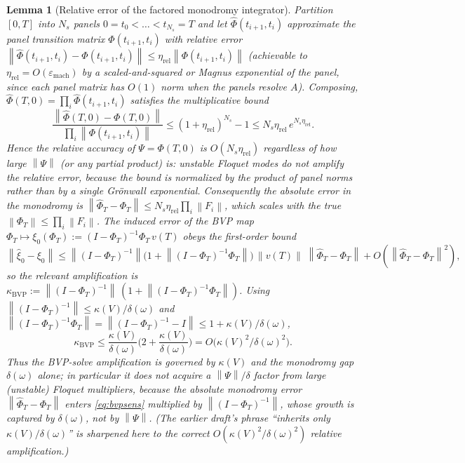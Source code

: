 \documentclass{amsart}
\newtheorem{lemma}{Lemma}
\theoremstyle{definition}
\newcommand{\norm}[1]{\left\lVert#1\right\rVert}
\begin{document}
\begin{lemma}[Relative error of the factored monodromy integrator]\label{lem:stiff}
Partition $[0,T]$ into $N_s$ panels $0=t_0<\dots<t_{N_s}=T$ and let
$\hat\Phi(t_{i+1},t_i)$ approximate the panel transition matrix
$\Phi(t_{i+1},t_i)$ with \emph{relative} error
$\norm{\hat\Phi(t_{i+1},t_i)-\Phi(t_{i+1},t_i)}\le\eta_{\mathrm{rel}}
\norm{\Phi(t_{i+1},t_i)}$ (achievable to $\eta_{\mathrm{rel}}=O(\varepsilon_{\mathrm{mach}})$
by a scaled-and-squared or Magnus exponential of the panel, since each panel
matrix has $O(1)$ norm when the panels resolve $A$). Composing,
$\hat\Phi(T,0)=\prod_i\hat\Phi(t_{i+1},t_i)$ satisfies the multiplicative bound
\begin{equation}\label{eq:stifferr}
\frac{\norm{\hat\Phi(T,0)-\Phi(T,0)}}{\prod_i\norm{\Phi(t_{i+1},t_i)}}
\le (1+\eta_{\mathrm{rel}})^{N_s}-1\le N_s\eta_{\mathrm{rel}}\,e^{N_s\eta_{\mathrm{rel}}}.
\end{equation}
Hence the \emph{relative} accuracy of $\Psi=\Phi(T,0)$ is $O(N_s\eta_{\mathrm{rel}})$
\emph{regardless of how large $\norm\Psi$ (or any partial product) is}: unstable
Floquet modes do not amplify the relative error, because the bound is normalized
by the product of panel norms rather than by a single Gr\"onwall exponential.
Consequently the absolute error in the monodromy is
$\norm{\hat\Phi_T-\Phi_T}\le N_s\eta_{\mathrm{rel}}\prod_i\norm{F_i}$, which
scales with the true $\norm{\Phi_T}\le\prod_i\norm{F_i}$. The induced error of
the BVP map $\Phi_T\mapsto\xi_0(\Phi_T):=(I-\Phi_T)^{-1}\Phi_T\,v(T)$ obeys the
first-order bound
\begin{equation}\label{eq:bvpsens}
\norm{\hat\xi_0-\xi_0}
\le \norm{(I-\Phi_T)^{-1}}\big(1+\norm{(I-\Phi_T)^{-1}\Phi_T}\big)\,
\norm{v(T)}\;\norm{\hat\Phi_T-\Phi_T}+O(\norm{\hat\Phi_T-\Phi_T}^2),
\end{equation}
so the relevant amplification is
$\kappa_{\mathrm{BVP}}:=\norm{(I-\Phi_T)^{-1}}\,(1+\norm{(I-\Phi_T)^{-1}\Phi_T})$.
Using $\norm{(I-\Phi_T)^{-1}}\le\kappa(V)/\delta(\omega)$ and
$\norm{(I-\Phi_T)^{-1}\Phi_T}=\norm{(I-\Phi_T)^{-1}-I}\le 1+\kappa(V)/\delta(\omega)$,
\begin{equation}\label{eq:kbvp}
\kappa_{\mathrm{BVP}}\le \frac{\kappa(V)}{\delta(\omega)}\Big(2+\frac{\kappa(V)}{\delta(\omega)}\Big)
= O\!\big(\kappa(V)^2/\delta(\omega)^2\big).
\end{equation}
Thus the BVP-solve amplification is governed by $\kappa(V)$ and the
\emph{monodromy gap} $\delta(\omega)$ alone; in particular it does \emph{not}
acquire a $\norm\Psi/\delta$ factor from large (unstable) Floquet multipliers,
because the absolute monodromy error $\norm{\hat\Phi_T-\Phi_T}$ enters
\eqref{eq:bvpsens} multiplied by $\norm{(I-\Phi_T)^{-1}}$, whose growth is
captured by $\delta(\omega)$, not by $\norm\Psi$. (The earlier draft's phrase
``inherits only $\kappa(V)/\delta(\omega)$'' is sharpened here to the correct
$O(\kappa(V)^2/\delta(\omega)^2)$ relative amplification.)
\end{lemma}
\end{document}
